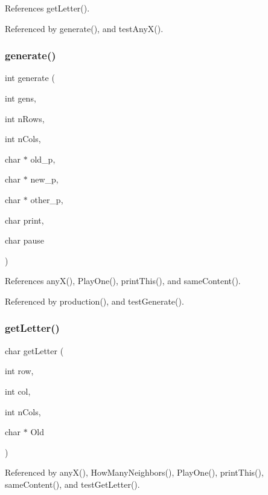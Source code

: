 References get\+Letter().



Referenced by generate(), and test\+Any\+X().

\mbox{\label{production_8h_a7986ca2f4339fb9c9d88ac88dff0f34d}} 
\subsubsection{generate()}
{\footnotesize\ttfamily int generate (\begin{DoxyParamCaption}\item[{int}]{gens,  }\item[{int}]{n\+Rows,  }\item[{int}]{n\+Cols,  }\item[{char $\ast$}]{old\+\_\+p,  }\item[{char $\ast$}]{new\+\_\+p,  }\item[{char $\ast$}]{other\+\_\+p,  }\item[{char}]{print,  }\item[{char}]{pause }\end{DoxyParamCaption})}



References any\+X(), Play\+One(), print\+This(), and same\+Content().



Referenced by production(), and test\+Generate().

\mbox{\label{production_8h_adc602acdc7ecd4199ad2b30ac03feb52}} 
\subsubsection{get\+Letter()}
{\footnotesize\ttfamily char get\+Letter (\begin{DoxyParamCaption}\item[{int}]{row,  }\item[{int}]{col,  }\item[{int}]{n\+Cols,  }\item[{char $\ast$}]{Old }\end{DoxyParamCaption})}



Referenced by any\+X(), How\+Many\+Neighbors(), Play\+One(), print\+This(), same\+Content(), and test\+Get\+Letter().

